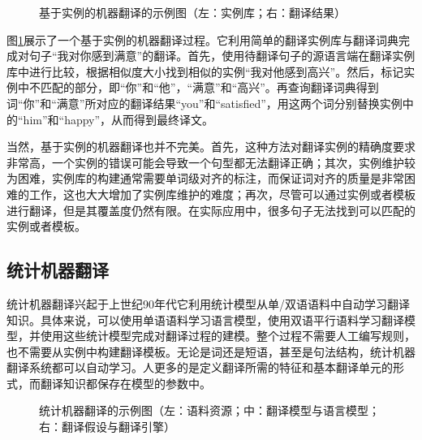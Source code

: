 \begin{figure}[htp]
    \centering

    \caption{基于实例的机器翻译的示例图（左：实例库；右：翻译结果）}
    \label{fig:1-10}
\end{figure}

\parinterval 图\ref{fig:1-10}展示了一个基于实例的机器翻译过程。它利用简单的翻译实例库与翻译词典完成对句子``我对你感到满意''的翻译。首先，使用待翻译句子的源语言端在翻译实例库中进行比较，根据相似度大小找到相似的实例``我对他感到高兴''。然后，标记实例中不匹配的部分，即``你''和``他''，``满意''和``高兴''。再查询翻译词典得到词``你''和``满意''所对应的翻译结果``you''和``satisfied''，用这两个词分别替换实例中的``him''和``happy''，从而得到最终译文。

\parinterval 当然，基于实例的机器翻译也并不完美。首先，这种方法对翻译实例的精确度要求非常高，一个实例的错误可能会导致一个句型都无法翻译正确；其次，实例维护较为困难，实例库的构建通常需要单词级对齐的标注，而保证词对齐的质量是非常困难的工作，这也大大增加了实例库维护的难度；再次，尽管可以通过实例或者模板进行翻译，但是其覆盖度仍然有限。在实际应用中，很多句子无法找到可以匹配的实例或者模板。


\subsection{统计机器翻译}

\parinterval 统计机器翻译兴起于上世纪90年代\cite{brown1990statistical,koehn2003statistical}它利用统计模型从单/双语语料中自动学习翻译知识。具体来说，可以使用单语语料学习语言模型，使用双语平行语料学习翻译模型，并使用这些统计模型完成对翻译过程的建模。整个过程不需要人工编写规则，也不需要从实例中构建翻译模板。无论是词还是短语，甚至是句法结构，统计机器翻译系统都可以自动学习。人更多的是定义翻译所需的特征和基本翻译单元的形式，而翻译知识都保存在模型的参数中。

\begin{figure}[htp]
    \centering

    \caption{统计机器翻译的示例图（左：语料资源；中：翻译模型与语言模型；右：翻译假设与翻译引擎）}
    \label{fig:1-11}
\end{figure}

